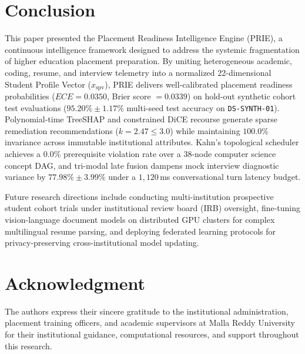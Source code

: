 \documentclass[conference]{IEEEtran}
\begin{document}
\section{Conclusion}

This paper presented the Placement Readiness Intelligence Engine (PRIE), a continuous intelligence framework designed to address the systemic fragmentation of higher education placement preparation. By uniting heterogeneous academic, coding, resume, and interview telemetry into a normalized 22-dimensional Student Profile Vector ($x_{\text{spv}}$), PRIE delivers well-calibrated placement readiness probabilities ($ECE = 0.0350$, Brier score $= 0.0339$) on hold-out synthetic cohort test evaluations ($95.20\% \pm 1.17\%$ multi-seed test accuracy on \texttt{DS-SYNTH-01}). Polynomial-time TreeSHAP and constrained DiCE recourse generate sparse remediation recommendations ($k = 2.47 \le 3.0$) while maintaining $100.0\%$ invariance across immutable institutional attributes. Kahn's topological scheduler achieves a $0.0\%$ prerequisite violation rate over a 38-node computer science concept DAG, and tri-modal late fusion dampens mock interview diagnostic variance by $77.98\% \pm 3.99\%$ under a $1,120$\,ms conversational turn latency budget.

Future research directions include conducting multi-institution prospective student cohort trials under institutional review board (IRB) oversight, fine-tuning vision-language document models on distributed GPU clusters for complex multilingual resume parsing, and deploying federated learning protocols for privacy-preserving cross-institutional model updating.

\section*{Acknowledgment}

The authors express their sincere gratitude to the institutional administration, placement training officers, and academic supervisors at Malla Reddy University for their institutional guidance, computational resources, and support throughout this research.
\end{document}
